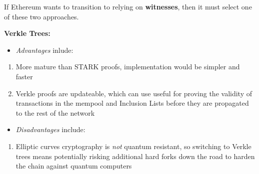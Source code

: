 \documentclass[12pt]{article}
\begin{document}
If Ethereum wants to transition to relying on \textbf{witnesses}, then it must select one of these two approaches. \\

\begin{minipage}[t]{0.48\textwidth} %
\textbf{Verkle Trees:}

\begin{itemize}
    \item[] \textit{Advantages} inlude:
\end{itemize}

    \begin{enumerate}
        \item More mature than STARK proofs, implementation would be simpler and faster
        \item Verkle proofs are updateable, which can use useful for proving the validity of transactions in the mempool and Inclusion Lists before they are propagated to the rest of the network
    \end{enumerate}

\begin{itemize}
    \item[] \textit{Disadvantages} include:
\end{itemize}

\begin{enumerate}
    \item Elliptic curves cryptography is \textit{not} quantum resistant, so switching to Verkle trees means potentially risking additional hard forks down the road to harden the chain against quantum computers
\end{enumerate}
    
\end{minipage}\hfill %
\end{document}

